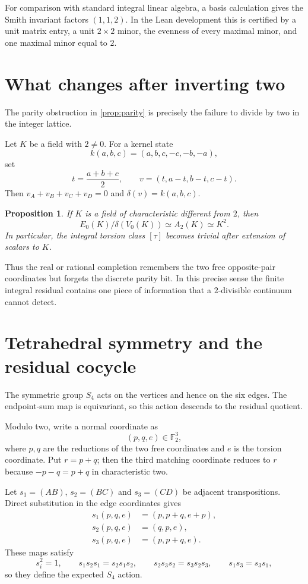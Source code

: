 \documentclass[11pt]{amsart}
\newtheorem{proposition}[theorem]{Proposition}
\theoremstyle{definition}
\theoremstyle{remark}
\newcommand{\F}{\mathbb F}
\begin{document}
For comparison with standard integral linear algebra, a basis calculation gives the Smith invariant factors $(1,1,2)$. In the Lean development this is certified by a unit matrix entry, a unit $2\times2$ minor, the evenness of every maximal minor, and one maximal minor equal to $2$.

\section{What changes after inverting two}

The parity obstruction in \cref{prop:parity} is precisely the failure to divide by two in the integer lattice.

Let $K$ be a field with $2\ne0$. For a kernel state
\[
k(a,b,c)=(a,b,c,-c,-b,-a),
\]
set
\[
t=\frac{a+b+c}{2},\qquad
v=(t,a-t,b-t,c-t).
\]
Then $v_A+v_B+v_C+v_D=0$ and $\delta(v)=k(a,b,c)$.

\begin{proposition}\label{prop:charneq2}
If $K$ is a field of characteristic different from $2$, then
\[
E_0(K)/\delta(V_0(K))\simeq A_2(K)\simeq K^2.
\]
In particular, the integral torsion class $[\tau]$ becomes trivial after extension of scalars to $K$.
\end{proposition}

Thus the real or rational completion remembers the two free opposite-pair coordinates but forgets the discrete parity bit. In this precise sense the finite integral residual contains one piece of information that a $2$-divisible continuum cannot detect.

\section{Tetrahedral symmetry and the residual cocycle}

The symmetric group $S_4$ acts on the vertices and hence on the six edges. The endpoint-sum map is equivariant, so this action descends to the residual quotient.

Modulo two, write a normal coordinate as
\[
(p,q,e)\in\F_2^3,
\]
where $p,q$ are the reductions of the two free coordinates and $e$ is the torsion coordinate. Put $r=p+q$; then the third matching coordinate reduces to $r$ because $-p-q=p+q$ in characteristic two.

Let $s_1=(AB)$, $s_2=(BC)$ and $s_3=(CD)$ be adjacent transpositions. Direct substitution in the edge coordinates gives
\begin{equation}\label{eq:generators}
\begin{aligned}
s_1(p,q,e)&=(p,p+q,e+p),\\
s_2(p,q,e)&=(q,p,e),\\
s_3(p,q,e)&=(p,p+q,e).
\end{aligned}
\end{equation}
These maps satisfy
\[
s_i^2=1,\qquad
s_1s_2s_1=s_2s_1s_2,\qquad
s_2s_3s_2=s_3s_2s_3,\qquad
s_1s_3=s_3s_1,
\]
so they define the expected $S_4$ action.
\end{document}
